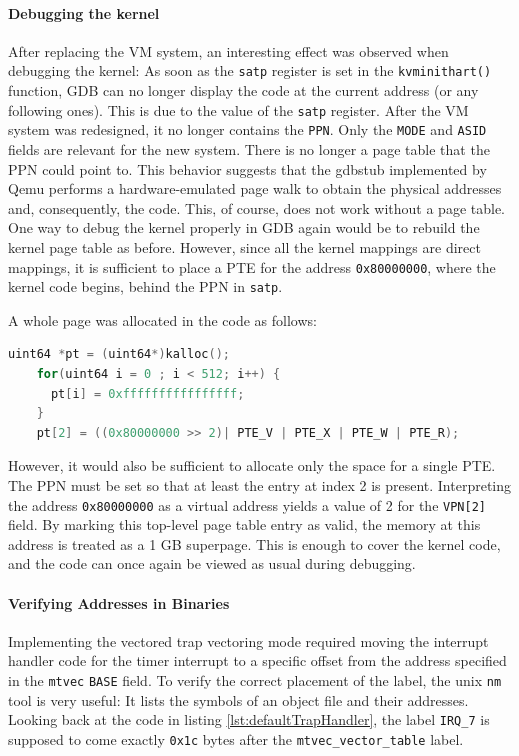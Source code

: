 \paragraph{Debugging the kernel} After replacing the VM system, an interesting effect was observed when debugging the kernel: As soon as the \texttt{satp} register is set in the \texttt{kvminithart()} function, GDB can no longer display the code at the current address (or any following ones). This is due to the value of the \texttt{satp} register. After the VM system was redesigned, it no longer contains the \texttt{PPN}. Only the \texttt{MODE} and \texttt{ASID} fields are relevant for the new system. There is no longer a page table that the PPN could point to. This behavior suggests that the gdbstub implemented by Qemu performs a hardware-emulated page walk to obtain the physical addresses and, consequently, the code. This, of course, does not work without a page table. One way to debug the kernel properly in GDB again would be to rebuild the kernel page table as before. However, since all the kernel mappings are direct mappings, it is sufficient to place a PTE for the address \texttt{0x80000000}, where the kernel code begins, behind the PPN in \texttt{satp}.

A whole page was allocated in the code as follows:
\begin{lstlisting}[language=c,float=h!, label={lst:fake_pt}]
    uint64 *pt = (uint64*)kalloc();
    for(uint64 i = 0 ; i < 512; i++) {
      pt[i] = 0xffffffffffffffff;
    }
    pt[2] = ((0x80000000 >> 2)| PTE_V | PTE_X | PTE_W | PTE_R);
\end{lstlisting}
However, it would also be sufficient to allocate only the space for a single PTE. The PPN must be set so that at least the entry at index 2 is present. Interpreting the address \texttt{0x80000000} as a virtual address yields a value of 2 for the \texttt{VPN[2]} field. By marking this top-level page table entry as valid, the memory at this address is treated as a 1 GB superpage. This is enough to cover the kernel code, and the code can once again be viewed as usual during debugging.

\paragraph{Verifying Addresses in Binaries} Implementing the vectored trap vectoring mode
required moving the interrupt handler code for the timer interrupt to a specific offset
from the address specified in the \texttt{mtvec} \texttt{BASE} field.
To verify the correct placement of the label, the unix \texttt{nm} tool is very useful:
It lists the symbols of an object file and their addresses.
Looking back at the code in listing \ref{lst:defaultTrapHandler}, the label \texttt{IRQ\_7}
is supposed to come exactly \texttt{0x1c} bytes after the \texttt{mtvec\_vector\_table} label.


